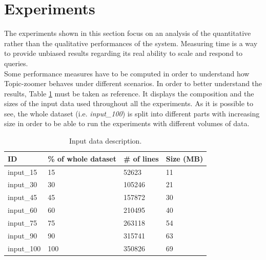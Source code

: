 \documentclass{sig-alternate-05-2015}
\begin{document}
\section{Experiments}\label{experiments}
The experiments shown in this section focus on an analysis of the quantitative rather than the qualitative performances of the system. Measuring time is a way to provide unbiased results regarding its real ability to scale and respond to queries.\\
Some performance measures have to be computed in order to understand how Topic-zoomer behaves under different scenarios. In order to better understand the results, Table \ref{datasets} must be taken as reference. It displays the composition and the sizes of the input data used throughout all the experiments. As it is possible to see, the whole dataset (i.e. \emph{input\_100}) is split into different parts with increasing size in order to be able to run the experiments with different volumes of data.

\begin{table}[]
    \centering
    \caption{Input data description.}
    \label{datasets}
    \begin{tabular}{llll}
    \hline
    ID         & \% of whole dataset & \# of lines & Size (MB) \\
    \hline
    input\_15  & 15                  & 52623       & 11        \\
    input\_30  & 30                  & 105246      & 21        \\
    input\_45  & 45                  & 157872      & 30        \\
    input\_60  & 60                  & 210495      & 40        \\
    input\_75  & 75                  & 263118      & 54        \\
    input\_90  & 90                  & 315741      & 63        \\
    input\_100 & 100                 & 350826      & 69
    \end{tabular}
\end{table}
\end{document}
